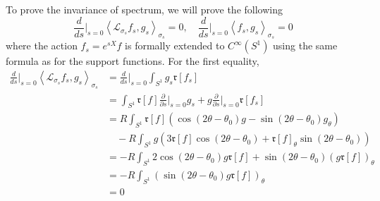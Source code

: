 \documentclass[12pt,a4paper]{article}
\begin{document}
To prove the invariance of spectrum, we will prove the following
\[ \frac{d}{d s}\bigg|_{s=0} \left< \mathcal{L}_{\sigma_{s}} f_{s},g_{s} \right>_{\sigma_{s}} = 0, \quad  \frac{d}{ds}\bigg|_{s=0} \left< f_{s}, g_{s} \right>_{\sigma_{s}} = 0  \]
where the action $ f_{s} = e^{sX}f $ is formally extended to $ C^{\infty}(S^1) $ using the same formula as for the support functions. For the first equality, \begin{align*}
   \frac{d}{d s}\bigg|_{s=0} \left< \mathcal{L}_{\sigma_{s}} f_{s},g_{s} \right>_{\sigma_{s}} & = \frac{d}{d s}\bigg|_{s=0} \int_{S^{1}}g_{s} \mathfrak{r}[f_{s}] \\
   & = \int_{S^{1}} \mathfrak{r}[f]\frac{\partial}{\partial s}\bigg|_{s=0}g_{s} + g \frac{\partial}{\partial s}\bigg|_{s=0}\mathfrak{r}\left[f_{s}\right]  \\
   & = R\int_{S^{1}} \mathfrak{r}[f](\cos(2 \theta-\theta_0)g - \sin(2 \theta-\theta_{0})g_{\theta}) \\
   & \quad - R\int_{S^{1}} g(3 \mathfrak{r}[f]\cos(2 \theta-\theta_{0})+ \mathfrak{r}[f]_{\theta}\sin(2 \theta-\theta_{0})) \\
   & = -R \int_{S^{1}} 2 \cos(2 \theta-\theta_{0})g \mathfrak{r}[f]+ \sin(2 \theta-\theta_{0})(g \mathfrak{r}[f])_{\theta} \\
   & = - R \int_{S^{1}} (\sin(2 \theta-\theta_{0})g \mathfrak{r}[f])_{\theta} \\
   & = 0
\end{align*}
\end{document}
